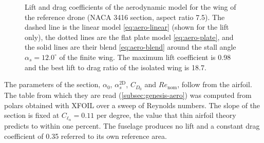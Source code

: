 \begin{figure}[htbp]
\caption[Lift and drag coefficients of the aerodynamic model]{Lift and drag coefficients of the aerodynamic model for the wing of the reference drone (NACA 3416 section, aspect ratio 7.5). The dashed line is the linear model \eqref{eq:aero-linear} (shown for the lift only), the dotted lines are the flat plate model \eqref{eq:aero-plate}, and the solid lines are their blend \eqref{eq:aero-blend} around the stall angle $\alpha_s = 12.0^{\circ}$ of the finite wing. The maximum lift coefficient is 0.98 and the best lift to drag ratio of the isolated wing is 18.7.}
\label{fig:aero-coefficients}
\end{figure}

The parameters of the section, $\alpha_0$, $\alpha_s^{\mathrm{2D}}$, $C_{D_0}$ and $\mathit{Re}_{\mathrm{nom}}$, follow from the airfoil. The table from which they are read (\autoref{subsec:genesis-aero}) was computed from polars obtained with XFOIL \cite{drela1989xfoil} over a sweep of Reynolds numbers. The slope of the section is fixed at $C_{\ell_\alpha} = 0.11$ per degree, the value that thin airfoil theory predicts to within one percent. The fuselage produces no lift and a constant drag coefficient of 0.35 referred to its own reference area.

